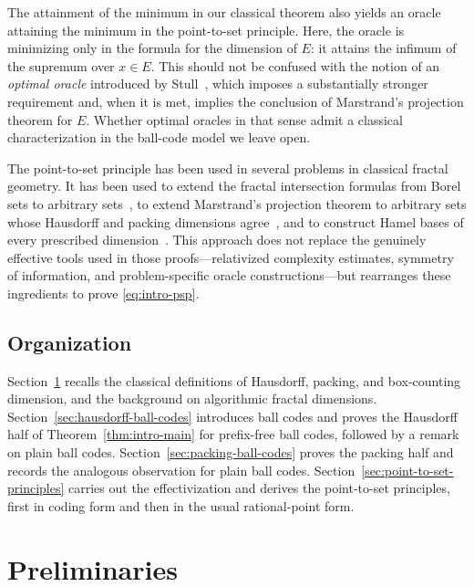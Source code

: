 \documentclass[a4paper,oneside,reqno,12pt]{amsart}
\theoremstyle{plain}
\theoremstyle{definition}
\theoremstyle{remark}
\begin{document}
The attainment of the minimum in our classical theorem also yields an oracle
attaining the minimum in the point-to-set principle.  Here, the oracle is
minimizing only in the formula for the dimension of \(E\): it attains the
infimum of the supremum over \(x\in E\).  This should not be confused with the
notion of an \emph{optimal oracle} introduced
by Stull~\cite{Stull2022}, which imposes a substantially stronger requirement and,
when it is met, implies the conclusion of Marstrand's projection theorem for
\(E\).  Whether optimal oracles in that sense admit a classical characterization in
the ball-code model we leave open.

The point-to-set principle has been used in several problems in classical
fractal geometry.  It has been used to extend the fractal intersection formulas from Borel sets to
arbitrary sets~\cite{Lutz2021}, to extend Marstrand's projection theorem to
arbitrary sets whose Hausdorff and packing dimensions agree~\cite{LutzStull2024},
and to construct Hamel bases of every prescribed dimension~\cite{LutzQiYu2024}.
This approach does not replace the genuinely effective tools used in those
proofs---relativized complexity estimates, symmetry of information, and
problem-specific oracle constructions---but rearranges these ingredients to
prove \eqref{eq:intro-psp}.



\subsection*{Organization}


Section~\ref{sec:preliminaries} recalls the classical definitions of Hausdorff,
packing, and box-counting dimension, and the background on algorithmic fractal
dimensions.  Section~\ref{sec:hausdorff-ball-codes} introduces ball codes and
proves the Hausdorff half of Theorem~\ref{thm:intro-main} for prefix-free ball
codes, followed by a remark on plain ball codes.
Section~\ref{sec:packing-ball-codes} proves
the packing half and records the analogous observation for plain ball codes.
Section~\ref{sec:point-to-set-principles} carries out the
effectivization and derives the point-to-set principles, first in coding form and
then in the usual rational-point form.

\section{Preliminaries}
\label{sec:preliminaries}
\end{document}
